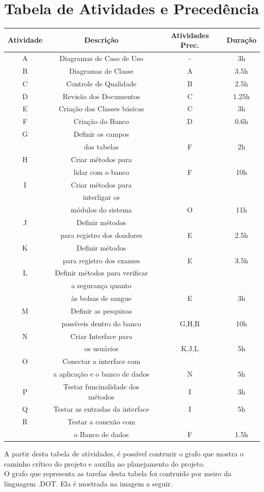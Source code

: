 \documentclass[12pt,a4paper,final]{article}
\begin{document}
\section{Tabela de Atividades e Precedência}
\begin{center}
\begin{tabular}{|c|c|c|c|}
\hline 
Atividade & Descrição & Atividades Prec. & Duração \\ 
\hline 
A & Diagramas de Caso de Uso & - & 3h \\ 
\hline 
B & Diagramas de Classe & A & 3.5h \\ 
\hline 
C & Controle de Qualidade & B & 2.5h \\ 
\hline 
D & Revisão dos Documentos & C & 1.25h \\
\hline 
E & Criação das Classes básicas & C & 3h \\
\hline 
F & Criação do Banco & D & 0.6h \\ 
\hline 
G & Definir os campos & & \\ & das tabelas & F & 2h \\ 
\hline 
H & Criar métodos para & & \\ & lidar com o banco & F & 10h \\
\hline 
I & Criar métodos para & & \\ & interligar os & & \\ & módulos do sistema & O & 11h \\
\hline 
J & Definir métodos & & \\ & para registro dos doadores & E & 2.5h \\ 
\hline 
K & Definir métodos & & \\ & para registro dos exames & E &  3.5h \\ 
\hline 
L & Definir métodos para verificar & & \\ & a segurança quanto & & \\ & às bolsas de sangue & E & 3h \\ 
\hline 
M & Definir as pesquisas  & & \\ & possíveis dentro do banco & G,H,R & 10h \\ 
\hline 
N & Criar Interface para & & \\ & os usuários & K,J,L & 5h \\ 
\hline 
O & Conectar a interface com & & \\ & a aplicação e o banco de dados & N & 5h \\ 
\hline 
P & Testar funcinalidade dos métodos & I & 3h \\ 
\hline 
Q & Testar as entradas da interface & I & 5h \\ 
\hline 
R & Testar a conexão com & & \\ & o Banco de dados & F & 1.5h \\ 
\hline 
\end{tabular} 
\end{center}
A partir desta tabela de atividades, é possível contrurir o grafo que mostra o caminho crítico do projeto e auxilia no planejamento do projeto.\\
O grafo que representa as tarefas desta tabela foi contruido por meiro da linguagem .DOT. Ela é mostrada na imagem a seguir.
\end{document}
